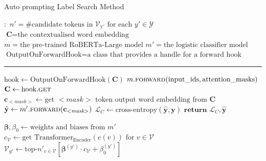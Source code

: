 \begin{algorithm}
\caption{Auto prompting Label Search Method} \label{alg:auto-label}
\begin{algorithmic}[1]
\small
\Require $\boldsymbol{:}$ 
\newline $n' = \text{\# candidate tokens in $\mathcal{V}_{\text{y}'}$ for each $y' \in \mathcal{Y}$}$ 
\newline $\textbf{C} = \text{the contextualised word embedding}$
\newline $m = \text{the pre-trained RoBERTa-Large model}$
\newline $m' = \text{the logistic classifier model}$
\newline $\text{OutputOnForwardHook} = \text{a class that provides a handle for a forward hook}$
\vspace{0.3em}
\hrule
\vspace{0.3em}

\State $\text{hook} \gets \text{OutputOnForwardHook}(\textbf{C})$
{\color{mylightgrey}}
    \State $m.\Call{forward}{\text{input\_ids}, \text{attention\_masks}}$
    {\color{mylightgrey}}
    \State $\textbf{C} \gets \text{hook}.\Call{get}{}$
    {\color{mylightgrey}}
    \State $\textbf{c}_\text{$<$$\textit{mask}$$>$} \gets \text{get $<$$\textit{mask}$$>$ token output word embedding from $\textbf{C}$}$
    \State $\hat{\textbf{y}} \gets m'.\Call{forward}{\textbf{c}_\text{$<$$\textit{mask}$$>$}}$
    {\color{mylightgrey}}
    \State $\mathcal{L}_C \gets \text{cross-entropy}(\hat{\textbf{y}}, \textbf{y})$
    {\color{mylightgrey}}
    \State $\textbf{return } \mathcal{L}_C, \hat{\textbf{y}}$
    {\color{mylightgrey}}
\EndFunction

    \State $\boldsymbol{\beta}, \beta_0 \gets \text{weights and biases from $m'$}$
    {\color{mylightgrey}}
    \State $c_\mathcal{V} \gets \text{get $\text{Transformer}_{\text{Encoder}}(e(v))$ for $v \in \mathcal{V}$}$
    {\color{mylightgrey}}
        \State $\mathcal{V}_{y'} \gets \text{top-}n'_{v \in \mathcal{V}}[\boldsymbol{\beta}^{(y')} \cdot c_\mathcal{V} + \beta_0^{(y')}]$
        {\color{mylightgrey}}    
    \EndFor
    
\EndFunction
\end{algorithmic}
\end{algorithm}
